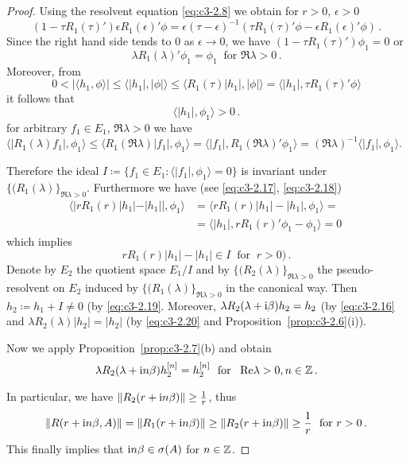 \begin{proof}
Using the resolvent equation \eqref{eq:c3-2.8} we obtain for $r > 0$, $\epsilon > 0$
\[
(1 - \tau R_{1}(\tau)')\epsilon R_{1}(\epsilon)'\phi = \epsilon(\tau-\epsilon)^{-1}(\tau R_{1}(\tau)'\phi - \epsilon R_{1}(\epsilon)'\phi)\,.
\]
Since the right hand side tends to $0$ as $\epsilon \to 0$, we have $(1 - \tau R_{1}(\tau)')\phi_{1} = 0$ or
\begin{equation}\label{eq:c3-2.18}
\lambda R_{1}(\lambda)'\phi_{1} = \phi_{1} \ \text{ for } \Re\lambda > 0\,.
\end{equation} 
Moreover, from 
\[
0 < |\langle h_{1},\phi \rangle| \leq \langle |h_{1}|,|\phi| \rangle \leq \langle R_{1}(\tau)|h_{1}|,|\phi| \rangle = \langle |h_{1}|,\tau R_{1}(\tau)'\phi \rangle 
\]
it follows that
\begin{equation}\label{eq:c3-2.19}
		\langle |h_{1}|,\phi_{1} \rangle > 0\,.
\end{equation}
for arbitrary $f_{1} \in E_{1}$, $\Re  \lambda > 0$ we have $\langle |R_{1}(\lambda)f_{1}|,\phi_{1} \rangle \leq \langle R_{1}(\Re \lambda)|f_{1}|,\phi_{1} \rangle = \langle |f_{1}|,R_{1}(\Re \lambda)'\phi_{1} \rangle = (\Re \lambda)^{-1}\langle |f_{1}|,\phi_{1} \rangle$.

Therefore the ideal $I \coloneqq \{f_{1} \in E_{1} \colon \langle |f_{1}|,\phi_{1} \rangle = 0\}$ is invariant under $\{(R_{1}(\lambda)\}_{\Re \lambda>0}$.
Furthermore we have (see \eqref{eq:c3-2.17}, \eqref{eq:c3-2.18}) 
\begin{align*}
	\langle |rR_{1}(r)|h_{1}| - |h_{1}||,\phi_{1} \rangle &= \langle rR_{1}(r)|h_{1}| - |h_{1}|,\phi_{1} \rangle = \\
	& = \langle |h_{1}|,rR_{1}(r)'\phi_{1} - \phi_{1} \rangle = 0\ 
\end{align*}	
which implies
\begin{equation}\label{eq:c3-2.20}
rR_{1}(r)|h_{1}| - |h_{1}| \in I \ \text{ for } \ r > 0)\,.
\end{equation}
Denote by $E_{2}$ the quotient space $E_{1}/I$ and by $\{(R_{2}(\lambda)\}_{\Re \lambda>0}$ the pseudo-resolvent on $E_{2}$ induced by $\{(R_{1}(\lambda)\}_{\Re \lambda>0}$ in the canonical way. 
Then $h_{2} \coloneqq h_{1} + I \neq 0$ (by \eqref{eq:c3-2.19}.
Moreover, $\lambda R_{2}(\lambda+\mathrm{i}\beta)h_{2} = h_{2}$ (by \eqref{eq:c3-2.16} and $\lambda R_{2}(\lambda)|h_{2}| = |h_{2}|$ (by \eqref{eq:c3-2.20} and Proposition~\ref{prop:c3-2.6}(i)).

Now we apply Proposition~\ref{prop:c3-2.7}(b) and obtain
\begin{equation}\label{eq:c3-2.21}
	\lambda R_{2}(\lambda+\mathrm{i} n\beta)h_{2}^{[n]} = h_{2}^{[n]}\ \text{ for } \ \mathop{}\!\mathrm{Re}\lambda > 0 , n \in \mathbb{Z}\,.
\end{equation}

In particular, we have $\|R_{2}(r+\mathrm{i} n\beta)\| \geq \frac{1}{r}$, thus 
\[
\|R(r+\mathrm{i} n\beta,A)\| = \|R_{1}(r+\mathrm{i} n\beta)\| \geq \|R_{2}(r+\mathrm{i} n\beta)\| \geq \frac{1}{r} \ \text{ for } r > 0\,.
\]
This finally implies that $ \mathrm{i} n\beta \in \sigma(A)$ for $n \in \mathbb{Z}$.
\end{proof}
